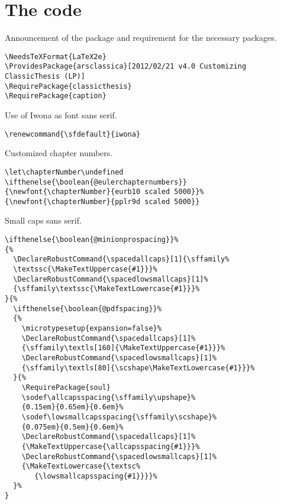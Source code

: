 \chapter{The code}
\label{chp:code}
 
 
\lstset{numbers=left,
    numberstyle=\scriptsize,
    stepnumber=1,
    numbersep=8pt
}    

Announcement of the package and requirement for the necessary packages.
\begin{lstlisting}[firstnumber=1]
\NeedsTeXFormat{LaTeX2e}
\ProvidesPackage{arsclassica}[2012/02/21 v4.0 Customizing ClassicThesis (LP)]
\RequirePackage{classicthesis}
\RequirePackage{caption}
\end{lstlisting}


Use of Iwona as font sans serif.
\begin{lstlisting}
\renewcommand{\sfdefault}{iwona}
\end{lstlisting}


Customized chapter numbers.
\begin{lstlisting}
\let\chapterNumber\undefined 
\ifthenelse{\boolean{@eulerchapternumbers}}
{\newfont{\chapterNumber}{eurb10 scaled 5000}}% 
{\newfont{\chapterNumber}{pplr9d scaled 5000}}
\end{lstlisting}



Small caps sans serif.
\begin{lstlisting}
\ifthenelse{\boolean{@minionprospacing}}%
{%
  \DeclareRobustCommand{\spacedallcaps}[1]{\sffamily%
  \textssc{\MakeTextUppercase{#1}}}%
  \DeclareRobustCommand{\spacedlowsmallcaps}[1]%
  {\sffamily\textssc{\MakeTextLowercase{#1}}}%
}{%
  \ifthenelse{\boolean{@pdfspacing}}%
  {%
    \microtypesetup{expansion=false}%
    \DeclareRobustCommand{\spacedallcaps}[1]%
    {\sffamily\textls[160]{\MakeTextUppercase{#1}}}%
    \DeclareRobustCommand{\spacedlowsmallcaps}[1]%
    {\sffamily\textls[80]{\scshape\MakeTextLowercase{#1}}}%
  }{%
    \RequirePackage{soul} 
    \sodef\allcapsspacing{\sffamily\upshape}%
    {0.15em}{0.65em}{0.6em}%
    \sodef\lowsmallcapsspacing{\sffamily\scshape}%
    {0.075em}{0.5em}{0.6em}%   
    \DeclareRobustCommand{\spacedallcaps}[1]%
    {\MakeTextUppercase{\allcapsspacing{#1}}}%   
	\DeclareRobustCommand{\spacedlowsmallcaps}[1]%
	{\MakeTextLowercase{\textsc%
	   {\lowsmallcapsspacing{#1}}}}%
  }%
}
\end{lstlisting}



